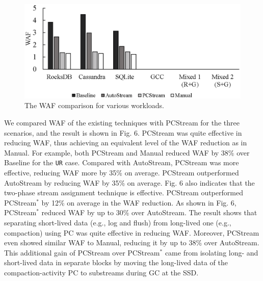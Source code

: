 \begin{figure}[t]
	\centering
	\includegraphics[width=0.9\linewidth]{figure/waf}
	\caption{The WAF comparison for various workloads.}
	\label{fig:exp}
\end{figure}


We compared WAF of the existing techniques with \textsf{\small PCStream} for the three
scenarios, and the result is shown in Fig. 6.  
\textsf{\small PCStream} was quite effective in reducing WAF, 
thus achieving an equivalent level of the WAF reduction as in \textsf{\small Manual}.  
For example, both \textsf{\small PCStream} and \textsf{\small Manual} reduced WAF by 38\% over \textsf{\small Baseline} for the \texttt{UR} case. 
Compared with \textsf{\small AutoStream}, \textsf{\small PCStream} was more effective, reducing WAF more by 35\% on average.  
\textsf{\small PCStream} outperformed \textsf{\small AutoStream} by reducing WAF by 35\% on average.
Fig. 6 also indicates that the two-phase stream assignment technique is effective.  
\textsf{\small PCStream} outperformed \textsf{\small PCStream$^{*}$} by 12\% on average in the WAF reduction.
As shown in Fig. 6, \textsf{\small PCStream$^*$} reduced WAF by up to 30\% over \textsf{\small AutoStream}.  
The result shows that separating short-lived data (e.g., log and flush) from long-lived one (e.g., compaction) using PC was quite effective in reducing WAF.  
Moreover, \textsf{\small PCStream} even showed similar WAF to \textsf{\small Manual}, reducing it by up to 38\% over \textsf{\small AutoStream}.  
This additional gain of \textsf{\small PCStream} over \textsf{\small PCStream$^{*}$} came from isolating long- and short-lived data in separate blocks 
by moving the long-lived data of the compaction-activity PC to substreams during GC at the SSD.

